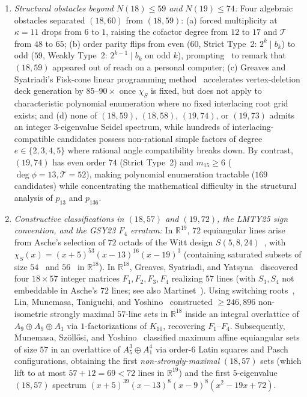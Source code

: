 \documentclass[11pt,reqno]{amsart}
\theoremstyle{definition}
\theoremstyle{remark}
\numberwithin{equation}{section}
\numberwithin{table}{section}
\begin{document}
\begin{enumerate}
  \item \emph{Structural obstacles beyond $N(18) \le 59$ and $N(19) \le 74$:}
  Four algebraic obstacles separated $(18, 60)$ from $(18, 59)$: (a) forced multiplicity at $\kappa = 11$ drops from $6$ to $1$, raising the cofactor degree from $12$ to $17$ and $\mathcal{T}$ from $48$ to $65$; (b) order parity flips from even ($60$, Strict Type~2: $2^k \mid b_k$) to odd ($59$, Weakly Type~2: $2^{k-1} \mid b_k$ on odd $k$), prompting~\cite[\S 9]{GSY2023} to remark that $(18, 59)$ appeared out of reach on a personal computer; (c) Greaves and Syatriadi's Fisk-cone linear programming method~\cite{GS2025} accelerates vertex-deletion deck generation by $85$--$90\times$ once $\chi_S$ is fixed, but does not apply to characteristic polynomial enumeration where no fixed interlacing root grid exists; and (d) none of $(18, 59)$, $(18, 58)$, $(19, 74)$, or $(19, 73)$ admits an integer $3$-eigenvalue Seidel spectrum, while hundreds of interlacing-compatible candidates possess non-rational simple factors of degree $e \in \{2, 3, 4, 5\}$ where rational angle compatibility breaks down. By contrast, $(19, 74)$ has even order $74$ (Strict Type~2) and $m_{15} \ge 6$ ($\deg\phi = 13, \mathcal{T} = 52$), making polynomial enumeration tractable ($169$ candidates) while concentrating the mathematical difficulty in the structural analysis of $p_{13}$ and $p_{136}$.

  \item \emph{Constructive classifications in $(18, 57)$ and $(19, 72)$, the LMTY25 sign convention, and the GSY23 $F_4$ erratum:}
  In $\mathbb{R}^{19}$, $72$ equiangular lines arise from Asche's selection of $72$ octads of the Witt design $S(5, 8, 24)$~\cite{Taylor1977,LinYu2020}, with $\chi_S(x) = (x+5)^{53}(x-13)^{16}(x-19)^3$ (containing saturated subsets of size $54$~\cite{Szollosi2019} and $56$~\cite{LinYu2020} in $\mathbb{R}^{18}$). In $\mathbb{R}^{18}$, Greaves, Syatriadi, and Yatsyna~\cite[\S 2]{GSY2023} discovered four $18 \times 57$ integer matrices $F_1, F_2, F_3, F_4$ realizing $57$ lines (with $S_3, S_4$ not embeddable in Asche's $72$ lines; see also Martinet~\cite{Martinet2024}). Using switching roots~\cite{CKMY2021,CKLY2022}, Lin, Munemasa, Taniguchi, and Yoshino~\cite{LMTY2025} constructed $\ge 246{,}896$ non-isometric strongly maximal $57$-line sets in $\mathbb{R}^{18}$ inside an integral overlattice of $A_9 \oplus A_9 \oplus A_1$ via $1$-factorizations of $K_{10}$, recovering $F_1$--$F_4$. Subsequently, Munemasa, Sz\"oll\H{o}si, and Yoshino~\cite{MSY2026} classified maximum affine equiangular sets of size $57$ in an overlattice of $A_5^3 \oplus A_1^4$ via order-$6$ Latin squares and Pasch configurations, obtaining the first \emph{non-strongly-maximal} $(18, 57)$ sets (which lift to at most $57 + 12 = 69 < 72$ lines in $\mathbb{R}^{19}$) and the first $5$-eigenvalue $(18, 57)$ spectrum $(x+5)^{39}(x-13)^8(x-9)^8(x^2-19x+72)$.


\end{enumerate}
\end{document}

